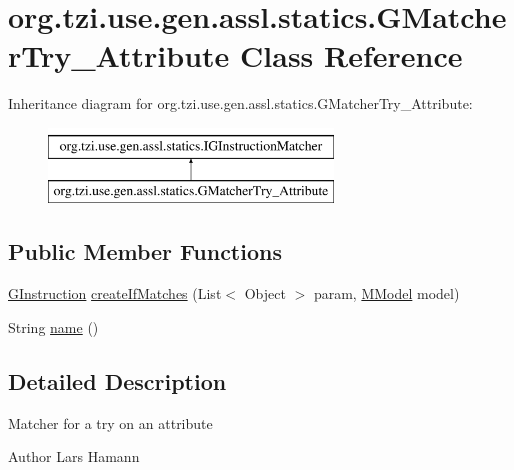 \hypertarget{classorg_1_1tzi_1_1use_1_1gen_1_1assl_1_1statics_1_1_g_matcher_try___attribute}{\section{org.\-tzi.\-use.\-gen.\-assl.\-statics.\-G\-Matcher\-Try\-\_\-\-Attribute Class Reference}
\label{classorg_1_1tzi_1_1use_1_1gen_1_1assl_1_1statics_1_1_g_matcher_try___attribute}
}
Inheritance diagram for org.\-tzi.\-use.\-gen.\-assl.\-statics.\-G\-Matcher\-Try\-\_\-\-Attribute\-:\begin{figure}[H]
\begin{center}
\leavevmode
\includegraphics[height=2.000000cm]{classorg_1_1tzi_1_1use_1_1gen_1_1assl_1_1statics_1_1_g_matcher_try___attribute}
\end{center}
\end{figure}
\subsection*{Public Member Functions}
\begin{DoxyCompactItemize}
\item 
\hyperlink{interfaceorg_1_1tzi_1_1use_1_1gen_1_1assl_1_1statics_1_1_g_instruction}{G\-Instruction} \hyperlink{classorg_1_1tzi_1_1use_1_1gen_1_1assl_1_1statics_1_1_g_matcher_try___attribute_a8663704420271c3db98902e6346be3fe}{create\-If\-Matches} (List$<$ Object $>$ param, \hyperlink{classorg_1_1tzi_1_1use_1_1uml_1_1mm_1_1_m_model}{M\-Model} model)
\item 
String \hyperlink{classorg_1_1tzi_1_1use_1_1gen_1_1assl_1_1statics_1_1_g_matcher_try___attribute_ab1a6515ddb5cd367440ba290084a605b}{name} ()
\end{DoxyCompactItemize}


\subsection{Detailed Description}
Matcher for a try on an attribute \begin{DoxyAuthor}{Author}
Lars Hamann 
\end{DoxyAuthor}


